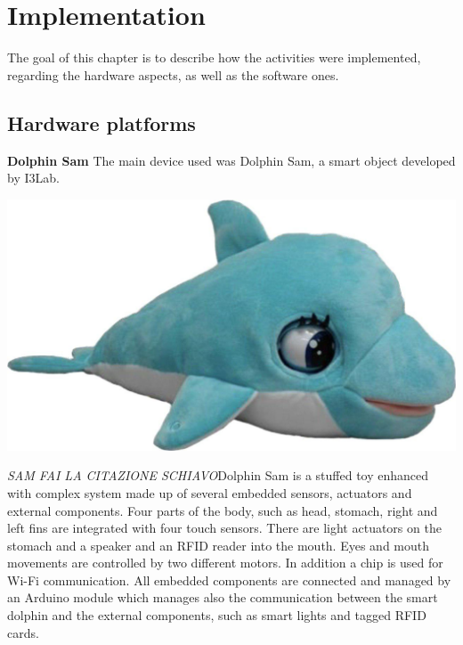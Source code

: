 	\chapter{Implementation}
	The goal of this chapter is to describe how the activities were implemented, regarding the hardware aspects, as well as the software ones.
	\section{Hardware platforms}
	{\textbf{\Large Dolphin Sam}} \newline \newline
	The main device used was Dolphin Sam, a smart object developed by I3Lab.
	\begin{center}
		\includegraphics[width=\textwidth]{images/Dolphin.jpg}
	\end{center}
	\noindent
	\textit{SAM FAI LA CITAZIONE SCHIAVO}Dolphin Sam is a stuffed toy enhanced with complex system made	up of several embedded sensors, actuators and external components. Four parts of the body, such as head, stomach, right and left fins are integrated with four touch sensors. There are light actuators on the stomach and a speaker and an RFID reader into the mouth. Eyes and mouth movements are controlled by two different motors. In addition a chip is used for Wi-Fi communication. \newline
	All embedded components are connected and managed by an Arduino module which manages also the communication between the smart dolphin and the external components, such as smart lights and tagged RFID cards.
	
	
	
	

		
